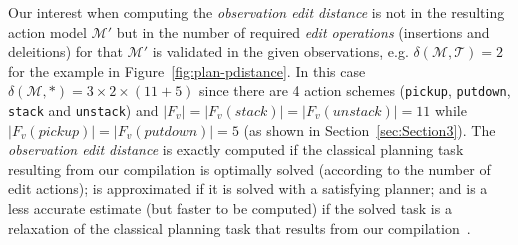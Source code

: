 \documentclass[letterpaper]{article} %
\begin{document}
Our interest when computing the {\em observation edit distance} is not in the resulting action model $\mathcal{M}'$ but in the number of required {\em edit operations} (insertions and deleitions) for that $\mathcal{M}'$ is validated in the given observations, e.g. $\delta(\mathcal{M},\mathcal{T})=2$ for the example in Figure~\ref{fig:plan-pdistance}. In this case $\delta(\mathcal{M},*)=3\times 2\times (11+5)$ since there are 4 action schemes ({\small\tt pickup}, {\small\tt putdown}, {\small\tt stack} and {\small\tt unstack}) and $|F_v|=|F_v(stack)|=|F_v(unstack)|=11$ while $|F_v(pickup)|=|F_v(putdown)|=5$  (as shown in Section~\ref{sec:Section3}). The {\em observation edit distance} is exactly computed if the classical planning task resulting from our compilation is optimally solved (according to the number of edit actions); is approximated if it is solved with a satisfying planner; and is a less accurate estimate (but faster to be computed) if the solved task is a relaxation of the classical planning task that results from our compilation~\cite{bonet2001planning}.
\end{document}
